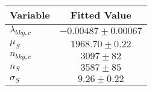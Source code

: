 \begin{tabular}[t]{lc}
\hline
Variable &Fitted Value\\
\hline\hline
$\lambda_{bkg,c}$&$-0.00487\pm0.00067$\\
\hline
$\mu_{S}$&$1968.70\pm0.22$\\
\hline
$n_{bkg,c}$&$3097\pm82$\\
\hline
$n_{S}$&$3587\pm85$\\
\hline
$\sigma_{S}$&$9.26\pm0.22$\\
\hline
\end{tabular}